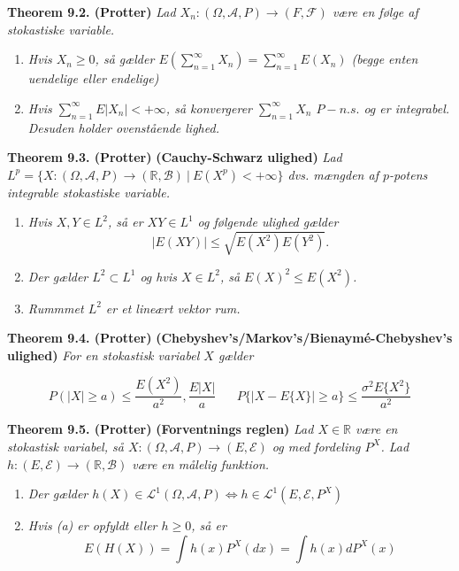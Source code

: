 \documentclass[a4paper,12pt,openany]{book}
\providecommand{\tightlist}{%
 \setlength{\itemsep}{0pt}\setlength{\parskip}{0pt}}
\begin{document}
\textbf{Theorem 9.2. (Protter)} \emph{Lad \(X_n : (\Omega,\mathcal{A},P)\to(F,\mathcal{F})\) være en følge af stokastiske variable.}

\begin{enumerate}
\def\labelenumi{\alph{enumi}.}
\tightlist
\item
  \emph{Hvis \(X_n\ge0\), så gælder \(E\left(\sum_{n=1}^\infty X_n\right)=\sum_{n=1}^\infty E(X_n)\) (begge enten uendelige eller endelige)}
\item
  \emph{Hvis \(\sum_{n=1}^\infty E\vert X_n\vert <+\infty\), så konvergerer \(\sum_{n=1}^\infty X_n\) \(P-n.s.\) og er integrabel. Desuden holder ovenstående lighed.}
\end{enumerate}

\textbf{Theorem 9.3. (Protter)} \textbf{(Cauchy-Schwarz ulighed)} \emph{Lad \(L^p=\{X : (\Omega,\mathcal{A},P)\to(\mathbb{R},\mathcal{B})\ \vert\ E(X^p)< +\infty\}\) dvs. mængden af \(p\)-potens integrable stokastiske variable.}

\begin{enumerate}
\def\labelenumi{\alph{enumi}.}
\tightlist
\item
  \emph{Hvis \(X,Y\in L^2\), så er \(XY\in L^1\) og følgende ulighed gælder}
  \[
    \vert E(XY)\vert \le \sqrt{E(X^2)E(Y^2)}.
    \]
\item
  \emph{Der gælder \(L^2\subset L^1\) og hvis \(X\in L^2\), så \(E(X)^2\le E(X^2)\).}
\item
  \emph{Rummmet \(L^2\) er et lineært vektor rum.}
\end{enumerate}

\textbf{Theorem 9.4. (Protter)} \textbf{(Chebyshev's/Markov's/Bienaymé-Chebyshev's ulighed)} \emph{For en stokastisk variabel \(X\) gælder}

\[
P(\vert X\vert \ge a)\le \frac{E(X^2)}{a^2},\frac{E\vert X\vert}{a} \hspace{20pt} P\{\vert X-E\{X\}\vert\ge a\}\le \frac{\sigma^2 E\{X^2\}}{a^2}
\]

\textbf{Theorem 9.5. (Protter)} \textbf{(Forventnings reglen)} \emph{Lad \(X\in \mathbb{R}\) være en stokastisk variabel, så \(X : (\Omega, \mathcal{A}, P)\to (E,\mathcal{E})\) og med fordeling \(P^X\). Lad \(h : (E,\mathcal{E})\to(\mathbb{R},\mathcal{B})\) være en målelig funktion.}

\begin{enumerate}
\def\labelenumi{\alph{enumi}.}
\tightlist
\item
  \emph{Der gælder \(h(X)\in\mathcal{L}^1(\Omega, \mathcal{A}, P)\iff h\in\mathcal{L}^1(E, \mathcal{E}, P^X)\)}
\item
  \emph{Hvis (a) er opfyldt eller \(h\ge 0\), så er}
  \[
    E(H(X))=\int h(x)P^X(dx)=\int h(x)dP^X(x)
    \]
\end{enumerate}
\end{document}
